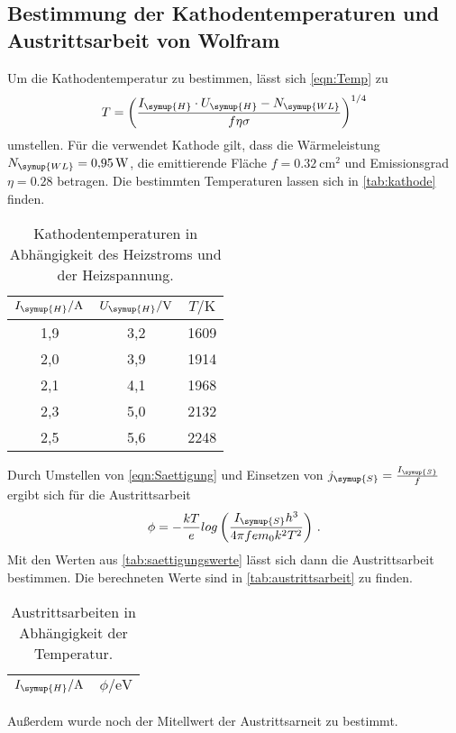 \subsection{Bestimmung der Kathodentemperaturen und Austrittsarbeit von Wolfram}
\label{sec:Wolfram}
Um die Kathodentemperatur zu bestimmen, lässt sich \autoref{eqn:Temp} zu
\begin{equation*}
  T = \left(\frac{I_{\symup{H}}\cdot U_{\symup{H}}-N_{\symup{WL}}}{f\eta\sigma}\right)^{1/4}
\end{equation*}
umstellen. Für die verwendet Kathode gilt, dass die Wärmeleistung $N_{\symup{WL}}=\SI{0,95}{\watt}$, die
emittierende Fläche $f=\SI{0,32}{\centi\meter^2}$ und Emissionsgrad $\eta = 0.28$ betragen. Die bestimmten
Temperaturen lassen sich in \autoref{tab:kathode} finden.
\begin{table}
  \centering
  \caption{Kathodentemperaturen in Abhängigkeit des Heizstroms und der Heizspannung.}
  \label{tab:kathode}
  \begin{tabular}{c c c}
    \toprule
    $I_{\symup{H}}/\si{\ampere}$ & $U_{\symup{H}}/\si{\volt}$ & $T/\si{\kelvin}$ \\
    \midrule
    1,9 & 3,2 & 1609 \\
    2,0 & 3,9 & 1914 \\
    2,1 & 4,1 & 1968 \\
    2,3 & 5,0 & 2132 \\
    2,5 & 5,6 & 2248 \\
    \bottomrule
  \end{tabular}
\end{table}
Durch Umstellen von \autoref{eqn:Saettigung} und Einsetzen von $j_{\symup{S}}=\frac{I_{\symup{S}}}{f}$ ergibt sich
für die Austrittsarbeit
\begin{equation*}
  \phi = -\frac{kT}{e} log\left(\frac{I_{\symup{S}}h^3}{4\pi fem_{0}k^2 T^2}\right)\,.
\end{equation*}
Mit den Werten aus \autoref{tab:saettigungswerte} lässt sich dann die Austrittsarbeit bestimmen. Die berechneten
Werte sind in \autoref{tab:austrittsarbeit} zu finden.
\begin{table}
  \centering
  \caption{Austrittsarbeiten in Abhängigkeit der Temperatur.}
  \label{tab:austrittsarbeit}
  \begin{tabular}{c c}
    \toprule
    $I_{\symup{H}}/\si{\ampere}$ & $\phi/\si{\eV}$ \\
    \midrule
    \bottomrule
  \end{tabular}
\end{table}
Außerdem wurde noch der Mitellwert der Austrittsarneit zu 
bestimmt.